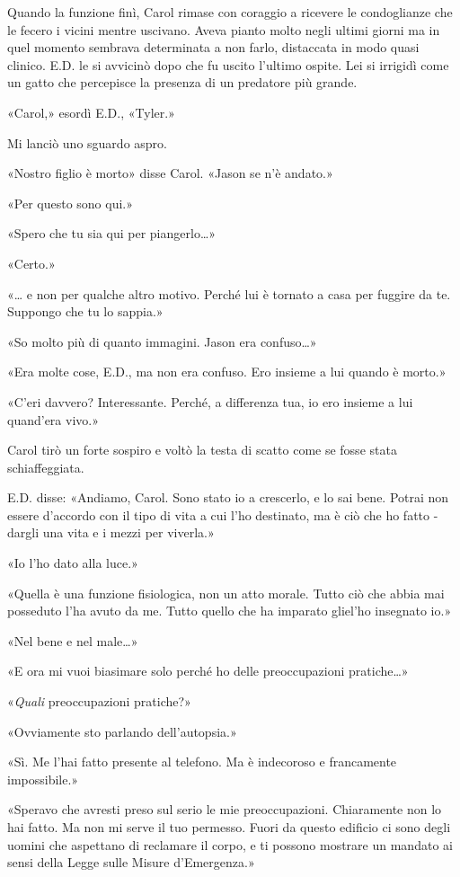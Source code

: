 Quando la funzione finì, Carol rimase con coraggio a ricevere le
condoglianze che le fecero i vicini mentre uscivano. Aveva pianto molto
negli ultimi giorni ma in quel momento sembrava determinata a non farlo,
distaccata in modo quasi clinico. E.D. le si avvicinò dopo che fu uscito
l'ultimo ospite. Lei si irrigidì come un gatto che percepisce la
presenza di un predatore più grande.

«Carol,» esordì E.D., «Tyler.»

Mi lanciò uno sguardo aspro.

«Nostro figlio è morto» disse Carol. «Jason se n'è andato.»

«Per questo sono qui.»

«Spero che tu sia qui per piangerlo\ldots»

«Certo.»

«\ldots{} e non per qualche altro motivo. Perché lui è tornato a casa
per fuggire da te. Suppongo che tu lo sappia.»

«So molto più di quanto immagini. Jason era confuso\ldots»

«Era molte cose, E.D., ma non era confuso. Ero insieme a lui quando è
morto.»

«C'eri davvero? Interessante. Perché, a differenza tua, io ero insieme a
lui quand'era vivo.»

Carol tirò un forte sospiro e voltò la testa di scatto come se fosse
stata schiaffeggiata.

E.D. disse: «Andiamo, Carol. Sono stato io a crescerlo, e lo sai bene.
Potrai non essere d'accordo con il tipo di vita a cui l'ho destinato, ma
è ciò che ho fatto - dargli una vita e i mezzi per viverla.»

«Io l'ho dato alla luce.»

«Quella è una funzione fisiologica, non un atto morale. Tutto ciò che
abbia mai posseduto l'ha avuto da me. Tutto quello che ha imparato
gliel'ho insegnato io.»

«Nel bene e nel male\ldots»

«E ora mi vuoi biasimare solo perché ho delle preoccupazioni
pratiche\ldots»

«\emph{Quali} preoccupazioni pratiche?»

«Ovviamente sto parlando dell'autopsia.»

«Sì. Me l'hai fatto presente al telefono. Ma è indecoroso e francamente
impossibile.»

«Speravo che avresti preso sul serio le mie preoccupazioni. Chiaramente
non lo hai fatto. Ma non mi serve il tuo permesso. Fuori da questo
edificio ci sono degli uomini che aspettano di reclamare il corpo, e ti
possono mostrare un mandato ai sensi della Legge sulle Misure
d'Emergenza.»

